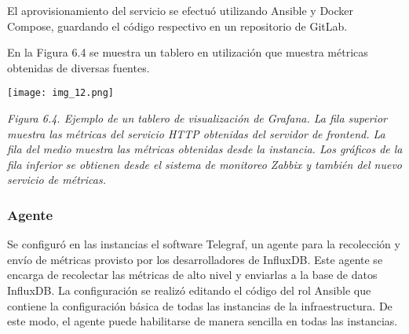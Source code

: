 El aprovisionamiento del servicio se efectuó utilizando Ansible y Docker Compose, guardando el código respectivo en un repositorio de GitLab.

En la Figura 6.4 se muestra un tablero en utilización que muestra métricas obtenidas de diversas fuentes.

\texttt{[image: img\_12.png]}


\textit{Figura 6.4. Ejemplo de un tablero de visualización de Grafana. La fila superior muestra las métricas del servicio HTTP obtenidas del servidor de frontend. La fila del medio muestra las métricas obtenidas desde la instancia. Los gráficos de la fila inferior se obtienen desde el sistema de monitoreo Zabbix y también del  nuevo servicio de métricas.}

\subsubsection{Agente}

Se configuró en las instancias el software Telegraf, un agente para la recolección y envío de métricas provisto por los desarrolladores de InfluxDB. Este agente se encarga de recolectar las métricas de alto nivel y enviarlas a la base de datos InfluxDB. La configuración se realizó editando el código del rol Ansible que contiene la configuración básica de todas las instancias de la infraestructura. De este modo, el agente puede habilitarse de manera sencilla en todas las instancias.





